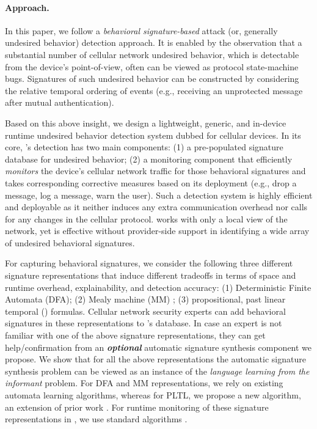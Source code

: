\paragraph{Approach.} In this paper, we follow a \emph{behavioral signature-based}
attack (or, generally undesired behavior) detection approach. It is enabled by the observation that a
substantial number of cellular network undesired behavior, which is detectable from the device's point-of-view,
often can be viewed as protocol state-machine bugs. Signatures of such undesired behavior can be constructed by
considering the relative temporal ordering of events (e.g., receiving an unprotected message
after mutual authentication).

Based on this above insight, we design a lightweight, generic, and in-device runtime
undesired behavior detection system
dubbed \system for cellular devices. In its core, \system{}'s detection has
two main components: (1) a pre-populated signature database for undesired behavior;
(2) a monitoring component that efficiently \emph{monitors} the device's cellular network
traffic for those behavioral signatures and takes corresponding corrective measures based
on its deployment (e.g., drop a message, log a message, warn the user).
%
%
Such a detection system is highly efficient and deployable as it
neither induces any extra communication overhead nor calls for any
changes in the cellular protocol. \system works with only a local view of the network,
yet is effective without provider-side support in identifying a wide array of undesired behavioral signatures.

For capturing behavioral signatures, we consider the following three different signature representations
that induce different tradeoffs in terms of space and runtime overhead, explainability, and detection accuracy:
(1) Deterministic Finite Automata (DFA);
(2) Mealy machine (MM) \cite{mealy1955method};
(3) propositional, past linear temporal (\pltl) \cite{ltl} formulas.
Cellular network security experts can add behavioral signatures in these representations
to \system{}'s  database. In case an expert is not
familiar with one of the above signature representations, they can get help/confirmation
from an \textbf{\emph{optional}} automatic signature synthesis component we propose.
We show that for all the above representations the automatic signature synthesis problem
can be viewed as an instance of the \emph{language learning from the informant} problem.
For DFA and MM representations, we rely on existing automata learning algorithms, whereas
for PLTL, we propose a new algorithm, an extension of
prior work \cite{learning_ltl}. For runtime monitoring of these signature representations
in \system, we use standard algorithms \cite{havelund2004}.



